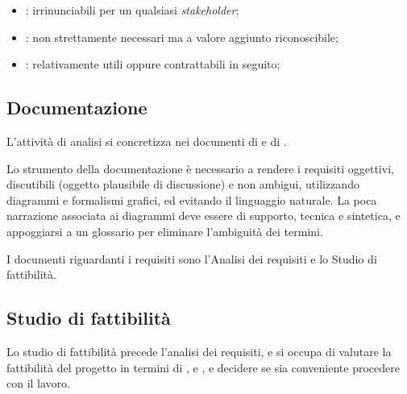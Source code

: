 \begin{itemize}
  \item {}: irrinunciabili per un qualsiasi
    \emph{stakeholder};
  \item {}: non strettamente necessari ma a valore aggiunto
        riconoscibile;
  \item {}: relativamente utili oppure contrattabili in seguito;
\end{itemize}

\subsection{Documentazione}
\label{sub:documentazione}

L'attività di analisi si concretizza nei documenti di 
e di .

Lo strumento della documentazione è necessario a rendere i requisiti oggettivi,
discutibili (oggetto plausibile di discussione) e non ambigui, utilizzando
diagrammi e formalismi grafici, ed evitando il linguaggio naturale. La poca
narrazione associata ai diagrammi deve essere di supporto, tecnica e sintetica,
e appoggiarsi a un glossario per eliminare l'ambiguità dei termini.

I documenti riguardanti i requisiti sono l'Analisi dei requisiti e lo Studio
di fattibilità.

\subsection{Studio di fattibilità}
\label{sub:studio_di_fattibilita}

Lo studio di fattibilità precede l'analisi dei requisiti, e si occupa di
valutare la fattibilità del progetto in termini di ,
 e , e decidere se sia conveniente procedere con
il lavoro.

